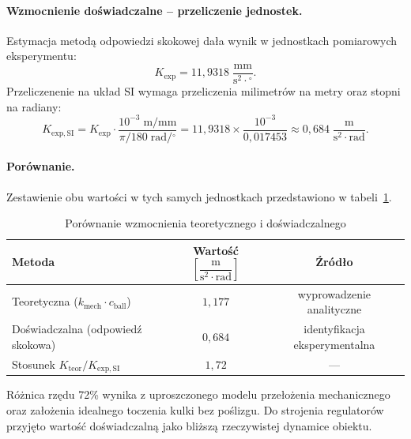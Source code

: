 \paragraph{Wzmocnienie doświadczalne -- przeliczenie jednostek.}
\mbox{}
Estymacja metodą odpowiedzi skokowej dała wynik w jednostkach pomiarowych eksperymentu:
\begin{equation}
    K_\mathrm{exp} = 11{,}9318 \; \frac{\mathrm{mm}}{\mathrm{s}^2 \cdot {^\circ}}.
    \label{eq:Kexp_raw}
\end{equation}
Przeliczenenie na układ SI wymaga przeliczenia milimetrów na metry oraz stopni na radiany:
\begin{equation}
    K_\mathrm{exp,SI}
    = K_\mathrm{exp} \cdot \frac{10^{-3}\;\mathrm{m/mm}}{\pi/180\;\mathrm{rad/{^\circ}}}
    = 11{,}9318 \times \frac{10^{-3}}{0{,}017453}
    \approx 0{,}684 \; \frac{\mathrm{m}}{\mathrm{s}^2 \cdot \mathrm{rad}}.
    \label{eq:Kexp_SI}
\end{equation}
 
\paragraph{Porównanie.}
\mbox{}
Zestawienie obu wartości w tych samych jednostkach przedstawiono
w tabeli~\ref{tab:Kcomp}.
\begin{table}[H]
\centering
\caption{Porównanie wzmocnienia teoretycznego i doświadczalnego}
\label{tab:Kcomp}
\begin{tabular}{lcc}
\hline
\textbf{Metoda} & \textbf{Wartość} $\left[\dfrac{\mathrm{m}}{\mathrm{s}^2 \cdot \mathrm{rad}}\right]$ & \textbf{Źródło} \\[6pt]
\hline
Teoretyczna ($k_\mathrm{mech} \cdot c_\mathrm{ball}$) & $1{,}177$ & wyprowadzenie analityczne \\
Doświadczalna (odpowiedź skokowa)                      & $0{,}684$ & identyfikacja eksperymentalna \\
\hline
Stosunek $K_\mathrm{teor}/K_\mathrm{exp,SI}$           & $1{,}72$  & --- \\
\hline
\end{tabular}
\end{table}
 
Różnica rzędu 72\% wynika z uproszczonego modelu przełożenia mechanicznego
oraz założenia idealnego toczenia kulki bez poślizgu. Do strojenia regulatorów przyjęto wartość doświadczalną jako bliższą rzeczywistej
dynamice obiektu.
 
 
